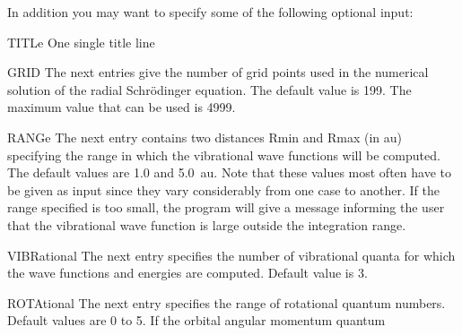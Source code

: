 In addition you may want to specify some of the following optional
input:
\begin{keywordlist}
\item[TITLe]
One single title line
\item[GRID]
The next entries give the number of grid points used in the numerical
solution of the radial Schr{\"o}dinger equation. The default value is
199. The maximum value that can be used is 4999.
\item[RANGe]
The next entry contains two distances Rmin and Rmax (in au) specifying
the range in which the vibrational wave functions will be computed.
The default values are 1.0 and 5.0~au. Note that these values most
often have to be given as input since they vary considerably from one
case to another. If the range specified is too small, the program will
give a message informing the user that the vibrational wave function
is large outside the integration range.
\item[VIBRational]
The next entry specifies the number of vibrational quanta for which the
wave functions and energies are computed. Default value is 3.
\item[ROTAtional]
The next entry specifies the range of rotational quantum numbers.
Default values are 0 to 5. If the orbital angular momentum quantum

\end{keywordlist}
